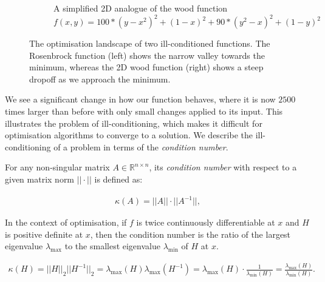 \begin{figure}[h]
\begin{subfigure}[b]{0.48\linewidth}
        \caption{A simplified 2D analogue of the wood function \\

        $f(x,y) = 100*(y - x^2)^2 + (1 - x)^2 + 90*(y^2 - x)^2 + (1 - y)^2$}

        \label{fig:wood_function}

    \end{subfigure}

    \caption{The optimisation landscape of two ill-conditioned functions. The Rosenbrock function (left) shows the narrow valley towards the minimum, whereas the 2D wood function (right) shows a steep dropoff as we approach the minimum.}

    \label{fig:ill_conditioned_functions}

\end{figure}



We see a significant change in how our function behaves, where it is now $2500$ times larger than before with only small changes applied to its input. This illustrates the problem of ill-conditioning, which makes it difficult for optimisation algorithms to converge to a solution. We describe the ill-conditioning of a problem in terms of the \textit{condition number}.




\begin{definition}

    For any non-singular matrix $A \in \mathbb{R}^{n \times n}$, its \textit{condition number} with respect to a given matrix norm $||\cdot||$ is defined as:

    \begin{align}

        \kappa(A) = ||A||\cdot||A^{-1}||,

    \end{align}

    In the context of optimisation, if $f$ is twice continuously differentiable at $x$ and $H$ is positive definite at $x$, then the condition number is the ratio of the largest eigenvalue $\lambda_{\max}$ to the smallest eigenvalue $\lambda_{\min}$ of $H$ at $x$. 

    \begin{align}

        \kappa(H) = ||H||_2||H^{-1}||_2 = \lambda_{\max}(H)\lambda_{\max}(H^{-1}) = \lambda_{\max}(H) \cdot \frac{1}{\lambda_{\min}(H)} = \frac{\lambda_{\max}(H)}{\lambda_{\min}(H)}.

    \end{align}

\end{definition}



